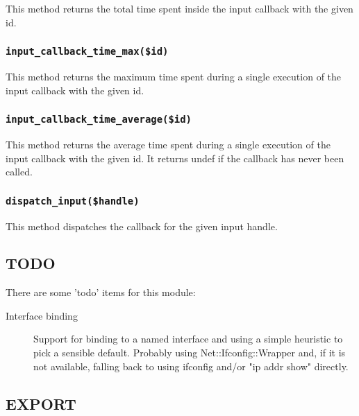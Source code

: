\documentclass[12pt,a4paper]{article}
\begin{document}
This method returns the total time spent inside the input callback with
the given id.

\subsubsection*{\texttt{input\_callback\_time\_max(\$id)}\label{xPL::Listener_input_callback_time_max_id_}}


This method returns the maximum time spent during a single execution
of the input callback with the given id.

\subsubsection*{\texttt{input\_callback\_time\_average(\$id)}\label{xPL::Listener_input_callback_time_average_id_}}


This method returns the average time spent during a single execution
of the input callback with the given id.  It returns undef if the
callback has never been called.

\subsubsection*{\texttt{dispatch\_input(\$handle)}\label{xPL::Listener_dispatch_input_handle_}}


This method dispatches the callback for the given input handle.

\subsection*{TODO\label{xPL::Listener_TODO}}


There are some 'todo' items for this module:

\begin{description}

\item[{Interface binding}] \mbox{}

Support for binding to a named interface and using a simple heuristic
to pick a sensible default.  Probably using Net::Ifconfig::Wrapper
and, if it is not available, falling back to using ifconfig and/or "ip
addr show" directly.

\end{description}
\subsection*{EXPORT\label{xPL::Listener_EXPORT}}
\end{document}
